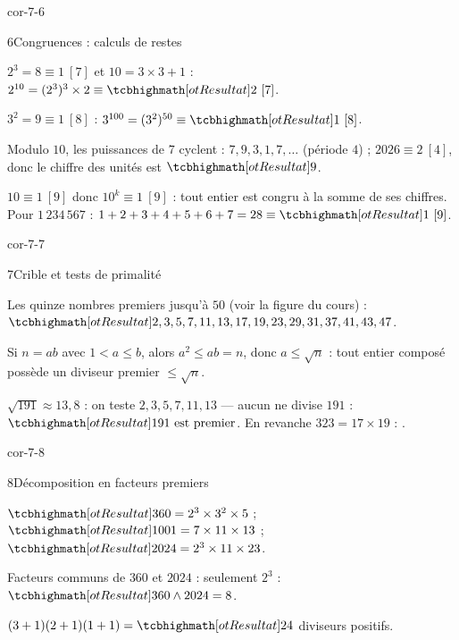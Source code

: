 \begin{blocLivre}{cor-7-6}
\begin{corrige}{6}{Congruences : calculs de restes}
\begin{questions}
  \item $2^{3}=8\equiv1\ [7]$ et $10=3\times3+1$ :
    $2^{10}=(2^{3})^{3}\times2\equiv\res{2}\ [7]$.
  \item $3^{2}=9\equiv1\ [8]$ : $3^{100}=(3^{2})^{50}\equiv\res{1}\ [8]$.
  \item Modulo $10$, les puissances de $7$ cyclent : $7,9,3,1,7,\dots$
    (période $4$) ; $2026\equiv2\ [4]$, donc le chiffre des unités est
    $\res{9}$.
  \item $10\equiv1\ [9]$ donc $10^{k}\equiv1\ [9]$ : tout entier est congru
    à la somme de ses chiffres. Pour $1\,234\,567$ :
    $1+2+3+4+5+6+7=28\equiv\res{1}\ [9]$.
\end{questions}
\end{corrige}
\end{blocLivre}

\begin{blocLivre}{cor-7-7}
\begin{corrige}{7}{Crible et tests de primalité}
\begin{questions}
  \item Les quinze nombres premiers jusqu'à $50$ (voir la figure du cours) :
    $\res{2,3,5,7,11,13,17,19,23,29,31,37,41,43,47}$.
  \item Si $n=ab$ avec $1<a\leq b$, alors $a^{2}\leq ab=n$, donc
    $a\leq\sqrt n$ : tout entier composé possède un diviseur premier
    $\leq\sqrt n$.
  \item $\sqrt{191}\approx13{,}8$ : on teste $2,3,5,7,11,13$ — aucun ne
    divise $191$ : $\res{191\text{ est premier}}$. En revanche
    $323=17\times19$ : .
\end{questions}
\end{corrige}
\end{blocLivre}

\begin{blocLivre}{cor-7-8}
\begin{corrige}{8}{Décomposition en facteurs premiers}
\begin{questions}
  \item $\res{360=2^{3}\times3^{2}\times5}$ ;\quad
    $\res{1001=7\times11\times13}$ ;\quad
    $\res{2024=2^{3}\times11\times23}$.
  \item Facteurs communs de $360$ et $2024$ : seulement $2^{3}$ :
    $\res{360\wedge2024=8}$.
  \item $(3+1)(2+1)(1+1)=\res{24}$ diviseurs positifs.
\end{questions}
\end{corrige}
\end{blocLivre}

